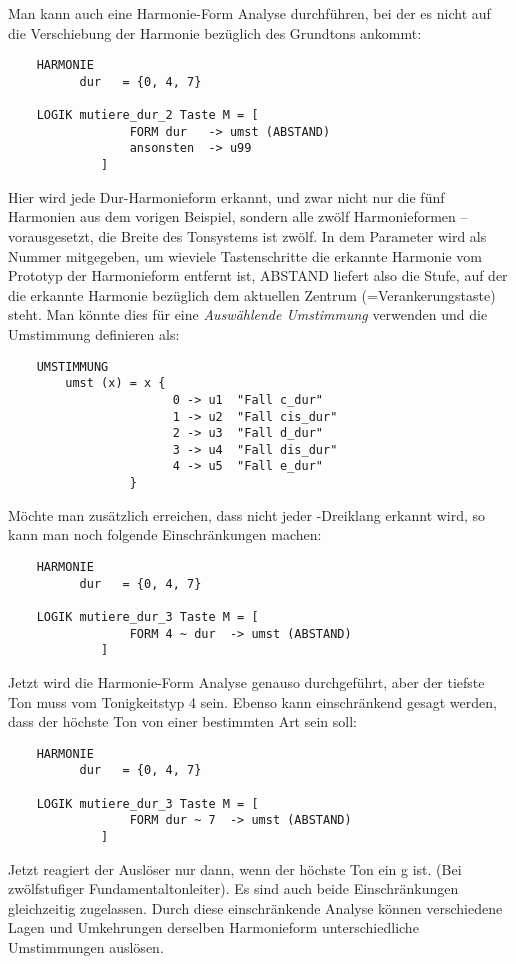 Man kann auch eine Harmonie-Form Analyse durchführen, bei der es
nicht auf die Verschiebung der Harmonie bezüglich des Grundtons
ankommt:
\begin{verbatim}
    HARMONIE 
          dur   = {0, 4, 7}

    LOGIK mutiere_dur_2 Taste M = [
                 FORM dur   -> umst (ABSTAND)
                 ansonsten  -> u99
             ]
\end{verbatim}
Hier wird jede Dur-Harmonieform erkannt, und zwar nicht nur die fünf
Harmonien aus dem vorigen Beispiel, sondern alle zwölf Harmonieformen
-- vorausgesetzt, die Breite des Tonsystems ist zwölf. In dem
Parameter  wird als Nummer mitgegeben, um wieviele
Tastenschritte die erkannte Harmonie vom Prototyp der Harmonieform
entfernt ist, ABSTAND liefert also die Stufe, auf der die erkannte
Harmonie bezüglich dem aktuellen Zentrum (=Verankerungstaste) steht.
Man könnte dies für eine \emph{Auswählende Umstimmung} verwenden und
die Umstimmung  definieren als:
\begin{verbatim}
    UMSTIMMUNG
        umst (x) = x {
                       0 -> u1  "Fall c_dur"
                       1 -> u2  "Fall cis_dur"
                       2 -> u3  "Fall d_dur"
                       3 -> u4  "Fall dis_dur"
                       4 -> u5  "Fall e_dur"
                 }
\end{verbatim}
Möchte man zusätzlich erreichen, dass nicht jeder 
-Dreiklang erkannt wird, so kann man noch folgende
Einschränkungen machen:
\begin{verbatim}
    HARMONIE 
          dur   = {0, 4, 7}

    LOGIK mutiere_dur_3 Taste M = [
                 FORM 4 ~ dur  -> umst (ABSTAND)
             ]
\end{verbatim}
Jetzt wird die Harmonie-Form Analyse genauso durchgeführt, aber
der tiefste Ton muss vom Tonigkeitstyp 4 sein. Ebenso kann einschränkend gesagt werden, dass der
höchste Ton von einer bestimmten Art sein soll:
\begin{verbatim}
    HARMONIE 
          dur   = {0, 4, 7}

    LOGIK mutiere_dur_3 Taste M = [
                 FORM dur ~ 7  -> umst (ABSTAND)
             ]
\end{verbatim}
Jetzt reagiert der Auslöser  nur dann, wenn der
höchste Ton ein g ist. (Bei zwölfstufiger Fundamentaltonleiter).  Es
sind auch beide Einschränkungen gleichzeitig zugelassen. Durch diese
einschränkende Analyse können verschiedene Lagen und Umkehrungen
derselben Harmonieform unterschiedliche Umstimmungen auslösen.

